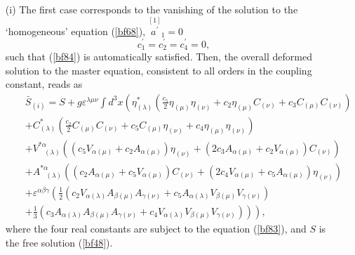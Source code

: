 \documentclass[a4paper,11pt]{article}
\begin{document}
\begin{enumerate}
\item[(i)]  The first case corresponds to the vanishing of the solution to
the `homogeneous' equation (\ref{bf68}), $\stackrel{[1]}{a^{\prime }}_{1}=0$%
\begin{equation}
c_{1}^{\prime }=c_{2}^{\prime }=c_{4}^{\prime }=0,  \label{bf87}
\end{equation}
such that (\ref{bf84}) is automatically satisfied. Then, the overall
deformed solution to the master equation, consistent to all orders in the
coupling constant, reads as
\begin{eqnarray}
&&\bar{S}_{(i)}=S+g\varepsilon ^{\lambda \mu \nu }\int d^{3}x\left( \eta
_{(\lambda )}^{*}\left( \frac{c_{5}}{2}\eta _{(\mu )}\eta _{(\nu
)}+c_{2}\eta _{(\mu )}C_{(\nu )}+c_{3}C_{(\mu )}C_{(\nu )}\right) \right.
\nonumber \\
&&+C_{(\lambda )}^{*}\left( \frac{c_{2}}{2}C_{(\mu )}C_{(\nu )}+c_{5}C_{(\mu
)}\eta _{(\nu )}+c_{4}\eta _{(\mu )}\eta _{(\nu )}\right)   \nonumber \\
&&+V_{\;\;\;(\lambda )}^{*\alpha }\left( \left( c_{5}V_{\alpha (\mu
)}+c_{2}A_{\alpha (\mu )}\right) \eta _{(\nu )}+\left( 2c_{3}A_{\alpha (\mu
)}+c_{2}V_{\alpha (\mu )}\right) C_{(\nu )}\right)   \nonumber \\
&&+A_{\;\;\;(\lambda )}^{*\alpha }\left( \left( c_{2}A_{\alpha (\mu
)}+c_{5}V_{\alpha (\mu )}\right) C_{(\nu )}+\left( 2c_{4}V_{\alpha (\mu
)}+c_{5}A_{\alpha (\mu )}\right) \eta _{(\nu )}\right)   \nonumber \\
&&+\varepsilon ^{\alpha \beta \gamma }\left( \frac{1}{2}\left(
c_{2}V_{\alpha (\lambda )}A_{\beta (\mu )}A_{\gamma (\nu )}+c_{5}A_{\alpha
(\lambda )}V_{\beta (\mu )}V_{\gamma (\nu )}\right) \right.   \nonumber \\
&&\left. \left. +\frac{1}{3}\left( c_{3}A_{\alpha (\lambda )}A_{\beta (\mu
)}A_{\gamma (\nu )}+c_{4}V_{\alpha (\lambda )}V_{\beta (\mu )}V_{\gamma (\nu
)}\right) \right) \right) ,  \label{bf88}
\end{eqnarray}
where the four real constants are subject to the equation (\ref{bf83}), and $%
S$ is the free solution (\ref{bf48}).


\end{enumerate}
\end{document}
